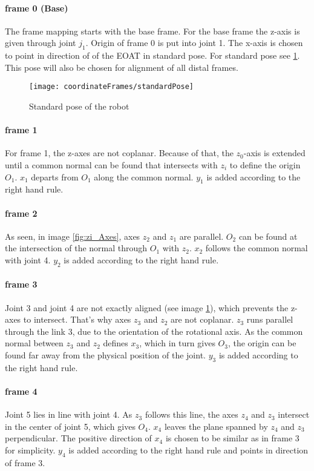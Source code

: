 \paragraph{frame 0 (Base)}
The frame mapping starts with the base frame. For the base frame the z-axis is given through joint $j_1$. Origin of frame 0 is put into joint 1.
The x-axis is chosen to point in direction of of the \ac{EOAT} in standard pose. For standard pose see \ref{fig:StandardPose}.
This pose will also be chosen for alignment of all distal frames.

\begin{figure}[h]
	\texttt{[image: coordinateFrames/standardPose]}
	\caption{Standard pose of the robot}
	\label{fig:StandardPose}
\end{figure}

\paragraph{frame 1}
For frame 1, the z-axes are not coplanar. 
Because of that, the  $z_0$-axis is extended until a common normal can be found that intersects with $z_i$ to define the origin $O_1$.
$x_1$ departs from $O_1$ along the common normal.
$y_1$ is added according to the right hand rule.

\paragraph{frame 2}
As seen, in image \ref{fig:zi_Axes}, axes $z_2$ and $z_1$ are parallel. $O_2$ can be found at the intersection of the normal through $O_1$ with $z_2$. $x_2$ follows the common normal with joint 4.
$y_2$ is added according to the right hand rule.

\paragraph{frame 3}
Joint 3 and joint 4 are not exactly aligned (see image \ref{fig:StandardPose}), which prevents the z-axes to intersect. That's why axes $z_3$ and $z_2$ are not coplanar. 
$z_3$ runs parallel through the link 3, due to the orientation of the rotational axis.
As the common normal between $z_3$ and $z_2$ defines $x_3$, which in turn gives $O_3$, the origin can be found far away from the physical position of the joint.
$y_3$ is added according to the right hand rule.

\paragraph{frame 4}
Joint 5 lies in line with joint 4.
As $z_3$ follows this line, the axes  $z_4$ and $z_3$ intersect in the center of joint 5, which gives $O_4$. 
$x_4$ leaves the plane spanned by  $z_4$ and $z_3$ perpendicular.
The positive direction of $x_4$ is chosen to be similar as in frame 3 for simplicity.
$y_4$ is added according to the right hand rule and points in direction of frame 3.


